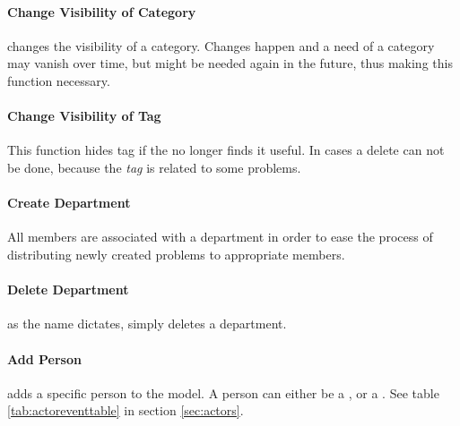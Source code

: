 \paragraph{Change Visibility of Category} changes the visibility of a category. Changes happen and a need of a category may vanish over time, but might be needed again in the future, thus making this function necessary. 

\paragraph{Change Visibility of Tag} This function hides tag if the \sadmin{} no longer finds it useful. In cases a delete can not be done, because the \textit{tag} is related to some problems. 




\paragraph{Create Department} All \astaff[] members are associated with a department in order to ease the process of distributing newly created problems to appropriate \astaff[] members. 

\paragraph{Delete Department} as the name dictates, simply deletes a department. 

\paragraph{Add Person} adds a specific person to the model. A person can either be a \aclient[], \astaff[] or a \admin[]. See table \ref{tab:actoreventtable} in section \ref{sec:actors}.

